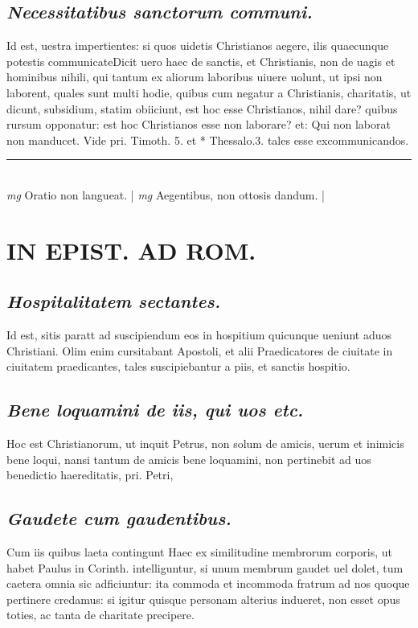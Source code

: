 \documentclass{article}
\begin{document}
\begin{pages}
\subsection*{\textit{Necessitatibus sanctorum communi. }}\pstart Id est, uestra impertientes: si quos uidetis Christianos aegere, ilis quaecunque potestis communicateDicit uero haec de sanctis, et Christianis, non de uagis et hominibus nihili, qui tantum ex aliorum laboribus uiuere uolunt, ut ipsi non laborent, quales sunt multi hodie, quibus cum negatur a Christianis, charitatis, ut dicunt, subsidium, statim obiiciunt, est hoc esse Christianos, nihil dare? quibus rursum opponatur: est hoc Christianos esse non laborare? et: Qui non laborat non manducet. Vide pri. Timoth. 5. et * Thessalo.3. tales esse excommunicandos.  \pend
\vspace{0.5cm}\noindent
\vspace{0.2cm}\rule{1cm}{0.2pt}\\ 
\hspace{0.2cm}\textit{mg}
\footnotesize Oratio non langueat. 
\normalsize| 
\hspace{0.2cm}\textit{mg}
\footnotesize Aegentibus, non ottosis dandum. 
\normalsize| 
\section*{IN EPIST. AD ROM.  }
\marginpar{[ p.140 ]}
{}
\subsection*{\textit{Hospitalitatem sectantes. }}\pstart Id est, sitis paratt ad suscipiendum eos in hospitium quicunque ueniunt aduos Christiani. Olim enim cursitabant Apostoli, et alii Praedicatores de ciuitate in ciuitatem praedicantes, tales suscipiebantur a piis, et sanctis hospitio.  \pend
{}
{}
\subsection*{\textit{Bene loquamini de iis, qui uos etc. }}\pstart Hoc est Christianorum, ut inquit Petrus, non solum de amicis, uerum et inimicis bene loqui, nansi tantum de amicis bene loquamini, non pertinebit ad uos benedictio haereditatis, pri. Petri,  \pend
{}
{}
\subsection*{\textit{Gaudete cum gaudentibus. }}\pstart Cum iis quibus laeta contingunt Haec ex similitudine membrorum corporis, ut habet Paulus in Corinth. intelliguntur, si unum membrum gaudet uel dolet, tum caetera omnia sic adficiuntur: ita commoda et incommoda fratrum ad nos quoque pertinere credamus: si igitur quisque personam alterius indueret, non esset opus toties, ac tanta de charitate precipere.  \pend
{}
{}

\end{pages}
\end{document}
